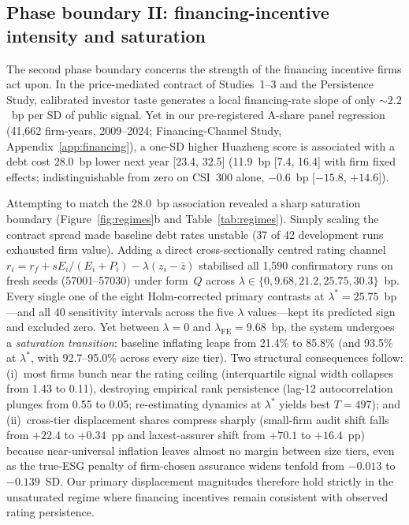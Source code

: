 \documentclass[11pt]{article}
\begin{document}
\subsection{Phase boundary II: financing-incentive intensity and saturation}

The second phase boundary concerns the strength of the financing incentive firms act upon. In the price-mediated contract of Studies~1--3 and the Persistence Study, calibrated investor taste generates a local financing-rate slope of only $\sim 2.2$~bp per SD of public signal. Yet in our pre-registered A-share panel regression (41,662 firm-years, 2009--2024; Financing-Channel Study, Appendix~\ref{app:financing}), a one-SD higher Huazheng score is associated with a debt cost 28.0~bp lower next year [23.4, 32.5] (11.9~bp [7.4, 16.4] with firm fixed effects; indistinguishable from zero on CSI~300 alone, $-0.6$~bp [$-15.8$, $+14.6$]).

Attempting to match the 28.0~bp association revealed a sharp saturation boundary (Figure~\ref{fig:regimes}b and Table~\ref{tab:regimes}). Simply scaling the contract spread made baseline debt rates unstable (37 of 42 development runs exhausted firm value). Adding a direct cross-sectionally centred rating channel $r_i = r_f + s E_i/(E_i+P_i) - \lambda(z_i - \bar z)$ stabilised all 1,590 confirmatory runs on fresh seeds (57001--57030) under form~$Q$ across $\lambda \in \{0, 9.68, 21.2, 25.75, 30.3\}$~bp. Every single one of the eight Holm-corrected primary contrasts at $\lambda^* = 25.75$~bp---and all 40 sensitivity intervals across the five $\lambda$ values---kept its predicted sign and excluded zero. Yet between $\lambda = 0$ and $\lambda_{\mathrm{FE}} = 9.68$~bp, the system undergoes a \emph{saturation transition}: baseline inflating leaps from 21.4\% to 85.8\% (and 93.5\% at $\lambda^*$, with 92.7--95.0\% across every size tier). Two structural consequences follow: (i)~most firms bunch near the rating ceiling (interquartile signal width collapses from 1.43 to 0.11), destroying empirical rank persistence (lag-12 autocorrelation plunges from 0.55 to 0.05; re-estimating dynamics at $\lambda^*$ yields best $T = 497$); and (ii)~cross-tier displacement shares compress sharply (small-firm audit shift falls from $+22.4$ to $+0.34$~pp and laxest-assurer shift from $+70.1$ to $+16.4$~pp) because near-universal inflation leaves almost no margin between size tiers, even as the true-ESG penalty of firm-chosen assurance widens tenfold from $-0.013$ to $-0.139$~SD. Our primary displacement magnitudes therefore hold strictly in the unsaturated regime where financing incentives remain consistent with observed rating persistence.
\end{document}
